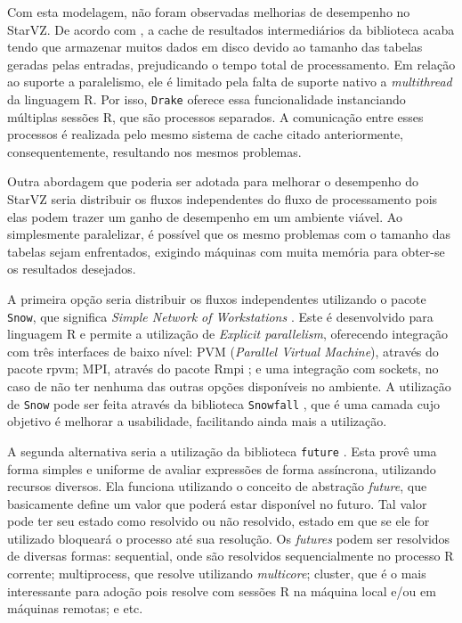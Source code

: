 Com esta modelagem, não foram observadas melhorias de desempenho no StarVZ. De 
acordo com \citet{ref:drakestarvz},
a cache de resultados intermediários da biblioteca acaba tendo que armazenar 
muitos dados em disco devido
ao tamanho das tabelas geradas pelas entradas, prejudicando o tempo 
total de processamento.
Em relação ao suporte a paralelismo, ele é limitado pela falta de suporte 
nativo 
a \emph{multithread} da linguagem R.
Por isso, \texttt{Drake} oferece essa funcionalidade instanciando múltiplas 
sessões R, que são processos separados. A comunicação
entre esses processos é realizada pelo mesmo sistema de cache citado 
anteriormente, consequentemente, resultando nos mesmos
problemas.

Outra abordagem que poderia ser adotada para melhorar o desempenho do StarVZ 
seria distribuir os fluxos independentes
do fluxo de processamento pois elas podem trazer um ganho de desempenho em um 
ambiente 
viável.
Ao simplesmente paralelizar, é possível que os mesmo problemas com o tamanho 
das tabelas sejam enfrentados, exigindo
máquinas com muita memória para obter-se os resultados desejados. 

A primeira opção seria distribuir os fluxos independentes utilizando o pacote 
\texttt{Snow}, que significa 
\emph{Simple Network of Workstations} \cite{ref:snow}. Este é desenvolvido para 
linguagem R e permite a utilização
de \emph{Explicit parallelism}, oferecendo integração com três interfaces de 
baixo nível: PVM (\emph{Parallel Virtual Machine}), através do pacote rpvm; 
MPI, 
através do pacote Rmpi \cite{ref:rmpi}; e uma integração com sockets, no caso 
de 
não ter nenhuma das outras 
opções disponíveis no ambiente. A utilização de \texttt{Snow} pode ser feita 
através da biblioteca \texttt{Snowfall} \cite{ref:snowfall},
que é uma camada cujo objetivo é melhorar a usabilidade, facilitando ainda 
mais a utilização.

A segunda alternativa seria a utilização da biblioteca \texttt{future} 
\cite{ref:future}. Esta provê uma forma simples e uniforme 
de avaliar expressões de forma assíncrona, utilizando recursos diversos. Ela 
funciona utilizando o conceito de abstração 
\emph{future}, que basicamente define um valor que poderá estar disponível no 
futuro. Tal valor pode ter seu estado como 
resolvido ou não resolvido, estado em que se ele for utilizado bloqueará o 
processo até sua resolução. Os \emph{futures} 
podem ser resolvidos de diversas formas: sequential, onde são resolvidos 
sequencialmente no processo R corrente; multiprocess,
que resolve utilizando \emph{multicore}; cluster, que é o mais interessante 
para 
adoção pois resolve com sessões R na máquina 
local e/ou em máquinas remotas; e etc.


